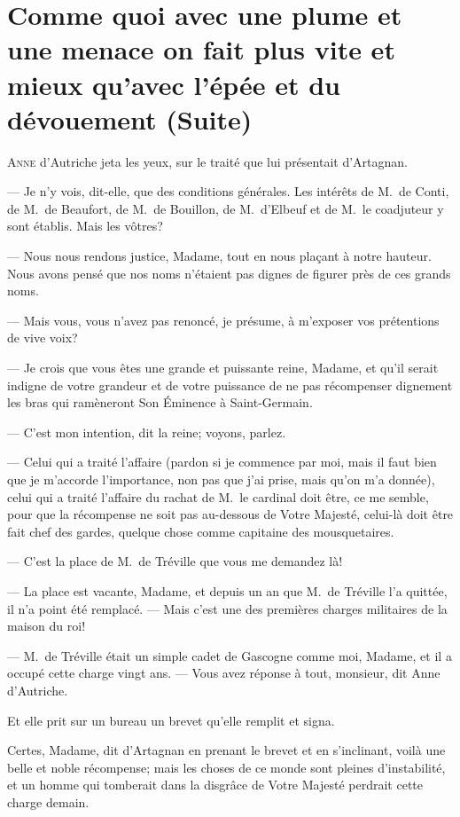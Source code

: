 \chapter[Avec une plume on fait mieux qu'avec l'épée (Suite)]{Comme quoi avec une plume et une menace on fait plus vite et mieux qu'avec l'épée et du dévouement (Suite)}

\lettrine{A}{nne} d'Autriche jeta les yeux, sur le traité que lui présentait d'Artagnan.

\zz
— Je n'y vois, dit-elle, que des conditions générales. Les intérêts de M.~de Conti, de M.~de Beaufort, de M.~de Bouillon, de M.~d'Elbeuf et de M.~le coadjuteur y sont établis. Mais les vôtres?

— Nous nous rendons justice, Madame, tout en nous plaçant à notre hauteur. Nous avons pensé que nos noms n'étaient pas dignes de figurer près de ces grands noms.

— Mais vous, vous n'avez pas renoncé, je présume, à m'exposer vos prétentions de vive voix?

— Je crois que vous êtes une grande et puissante reine, Madame, et qu'il serait indigne de votre grandeur et de votre puissance de ne pas récompenser dignement les bras qui ramèneront Son Éminence à Saint-Germain.

— C'est mon intention, dit la reine; voyons, parlez.

— Celui qui a traité l'affaire (pardon si je commence par moi, mais il faut bien que je m'accorde l'importance, non pas que j'ai prise, mais qu'on m'a donnée), celui qui a traité l'affaire du rachat de M.~le cardinal doit être, ce me semble, pour que la récompense ne soit pas au-dessous de Votre Majesté, celui-là doit être fait chef des gardes, quelque chose comme capitaine des mousquetaires.

— C'est la place de M.~de Tréville que vous me demandez là!

— La place est vacante, Madame, et depuis un an que M.~de Tréville l'a quittée, il n'a point été remplacé.
— Mais c'est une des premières charges militaires de la maison du roi!

— M.~de Tréville était un simple cadet de Gascogne comme moi, Madame, et il a occupé cette charge vingt ans.
— Vous avez réponse à tout, monsieur, dit Anne d'Autriche.

Et elle prit sur un bureau un brevet qu'elle remplit et signa.

Certes, Madame, dit d'Artagnan en prenant le brevet et en s'inclinant, voilà une belle et noble récompense; mais les choses de ce monde sont pleines d'instabilité, et un homme qui tomberait dans la disgrâce de Votre Majesté perdrait cette charge demain.

